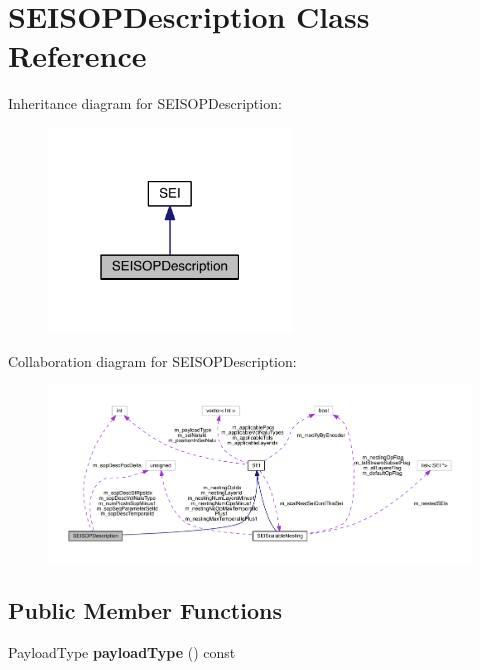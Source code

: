 \hypertarget{class_s_e_i_s_o_p_description}{}\section{S\+E\+I\+S\+O\+P\+Description Class Reference}
\label{class_s_e_i_s_o_p_description}


Inheritance diagram for S\+E\+I\+S\+O\+P\+Description\+:
\nopagebreak
\begin{figure}[H]
\begin{center}
\leavevmode
\includegraphics[width=183pt]{d7/dca/class_s_e_i_s_o_p_description__inherit__graph}
\end{center}
\end{figure}


Collaboration diagram for S\+E\+I\+S\+O\+P\+Description\+:
\nopagebreak
\begin{figure}[H]
\begin{center}
\leavevmode
\includegraphics[width=350pt]{d7/db1/class_s_e_i_s_o_p_description__coll__graph}
\end{center}
\end{figure}
\subsection*{Public Member Functions}
\begin{DoxyCompactItemize}
\item 
\mbox{\label{class_s_e_i_s_o_p_description_a5a4c98d2b87158cb0c924dbfc9325f8a}} 
Payload\+Type {\bfseries payload\+Type} () const
\end{DoxyCompactItemize}

